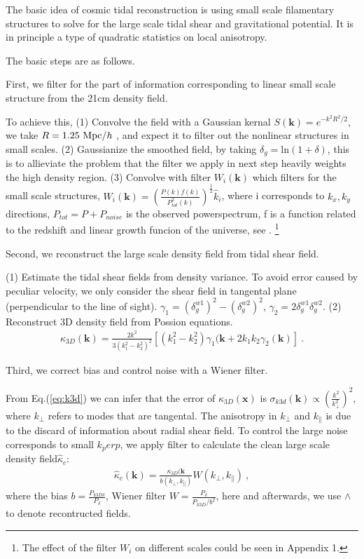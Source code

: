 The basic idea of cosmic tidal reconstruction is using small scale filamentary structures to solve for the large scale tidal shear and gravitational potential. 
It is in principle a type of quadratic statistics on local anisotropy.

The basic steps are as follows.

First, we filter for the part of information corresponding to linear small scale structure from the 21cm density field.

To achieve this, (1) Convolve the field with a Gaussian kernal
$S(\bm{k})=e^{-k^2R^2/2}$, 
we take $R=1.25\ \mathrm{Mpc}/h$ \cite{2012:pen}\cite{2015:zhu},
and expect it to filter out the nonlinear structures in small scales.
(2) Gaussianize the smoothed field, by taking 
$\delta_g=\mathrm{ln}(1+\delta)$, 
this is to allieviate the problem that the filter we apply in next step heavily weights the high density region.
(3) Convolve with filter $W_i(\bm{k})$ which filters for the small scale structures, 
$W_i(\bm{k})=(\frac{P(k)f(k)}{P_{tot}^2(k)})^{\frac{1}{2}}\hat{k}_i$,
where i corresponds to $k_x,k_y$ directions, $P_{tot}=P+P_{noise}$ is the observed powerspectrum, f is a function related to the redshift and linear growth funcion of the universe, see 
\cite{2015:zhu}.
\footnote{The effect of the filter $W_i$ on different scales could be seen in Appendix 1.}

Second, we reconstruct the large scale density field from tidal shear field.

(1) Estimate the tidal shear fields from density variance.
To avoid error caused by peculiar velocity, we only consider the shear field in tangental plane
(perpendicular to the line of sight).
$\gamma_1=(\delta_g^{w1})^2-(\delta_g^{w2})^2$,
$\gamma_2=2\delta_g^{w1}\delta_g^{w2}$.
(2) Reconstruct 3D density field from Possion equations.
\begin{eqnarray}
\label{eq:k3d}
\kappa_{3D}(\bm{k})=\frac{2k^2}{3(k_1^2-k_2^2)^2}[(k_1^2-k_2^2)\gamma_1(\bm{k}+2k_1k_2\gamma_2(\bm{k})]\ .
\end{eqnarray}

Third, we correct bias and control noise with a Wiener filter.

From Eq.(\ref{eq:k3d}) we can infer that the error of $\kappa_{3D}(\bm{x})$ is 
$\sigma_{k3d}(\bm{k})\propto(\frac{k^2}{k_\perp^2})^2$, where $k_\perp$ refers to modes that are tangental.
The anisotropy in $k_\perp$ and $k_\parallel$ is due to the discard of information about radial shear field.
To control the large noise corresponds to small $k_perp$, we apply filter to calculate the clean large scale density field$\hat \kappa_c$:
\begin{eqnarray}
	\label{eq:wiener}
\hat \kappa_{c}(\bm{k})=\frac{\kappa_{3D}(\bm{k}}{b(k_\perp,k_\parallel)}W(k_\perp,k_\parallel)\ ,
\end{eqnarray}
where the bias $b=\frac{P_{k3D \delta}}{P_\delta}$, Wiener filter $W=\frac{P_\delta}{P_{k3D}/b^2}$, here and afterwards, 
we use $\wedge$ to denote recontructed fields.

